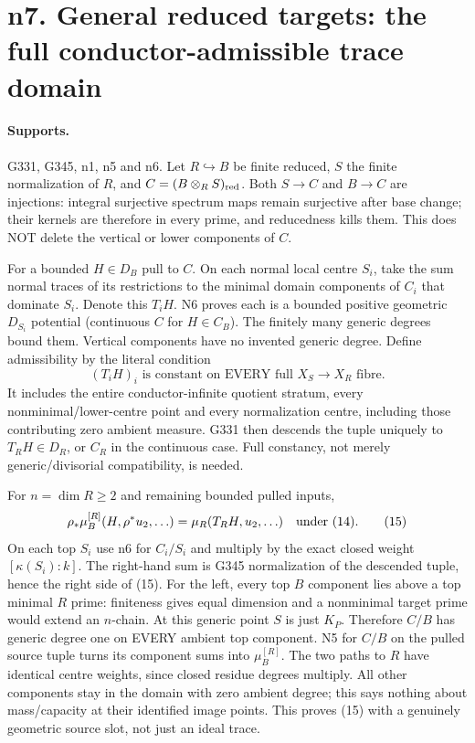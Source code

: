 \section{n7. General reduced targets: the full conductor-admissible trace domain}
\paragraph{Supports.} G331, G345, n1, n5 and n6.
Let $R\hookrightarrow B$ be finite reduced, $S$ the finite normalization of $R$, and $C=(B\otimes_RS)_{\rm red}$. Both $S\to C$ and $B\to C$ are injections: integral surjective spectrum maps remain surjective after base change; their kernels are therefore in every prime, and reducedness kills them. This does NOT delete the vertical or lower components of $C$.

For a bounded $H\in D_B$ pull to $C$. On each normal local centre $S_i$, take the sum normal traces of its restrictions to the minimal domain components of $C_i$ that dominate $S_i$. Denote this $T_iH$. N6 proves each is a bounded positive geometric $D_{S_i}$ potential (continuous $C$ for $H\in C_B$). The finitely many generic degrees bound them. Vertical components have no invented generic degree. Define admissibility by the literal condition
\[
 (T_iH)_i\text{ is constant on EVERY full }X_S\to X_R\text{ fibre}. \tag{14}
\]
It includes the entire conductor-infinite quotient stratum, every nonminimal/lower-centre point and every normalization centre, including those contributing zero ambient measure. G331 then descends the tuple uniquely to $T_RH\in D_R$, or $C_R$ in the continuous case. Full constancy, not merely generic/divisorial compatibility, is needed.

For $n=\dim R\ge2$ and remaining bounded pulled inputs,
\[
 \rho_*\mu_B^{[R]}(H,\rho^*u_2,\ldots)
 =\mu_R(T_RH,u_2,\ldots)\quad\hbox{under (14)}. \tag{15}
\]
On each top $S_i$ use n6 for $C_i/S_i$ and multiply by the exact closed weight $[\kappa(S_i):k]$. The right-hand sum is G345 normalization of the descended tuple, hence the right side of (15). For the left, every top $B$ component lies above a top minimal $R$ prime: finiteness gives equal dimension and a nonminimal target prime would extend an $n$-chain. At this generic point $S$ is just $K_P$. Therefore $C/B$ has generic degree one on EVERY ambient top component. N5 for $C/B$ on the pulled source tuple turns its component sums into $\mu_B^{[R]}$. The two paths to $R$ have identical centre weights, since closed residue degrees multiply. All other components stay in the domain with zero ambient degree; this says nothing about mass/capacity at their identified image points. This proves (15) with a genuinely geometric source slot, not just an ideal trace.


